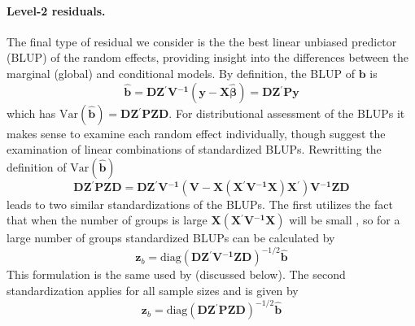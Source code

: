 \documentclass[12pt]{article} %
\newcommand{\inv}{\ensuremath{^{-1}}}
\newcommand{\trans}{\ensuremath{^\prime}}
\newcommand{\var}{\ensuremath{\mathrm{Var}}}
\begin{document}
\paragraph{Level-2 residuals.}
The final type of residual we consider is the the best linear unbiased predictor (BLUP) of the random effects, providing insight into the differences between the marginal (global) and conditional models. By definition, the BLUP of $\bm{b}$ is
%
\begin{equation}\label{eq:lev2resid}
\widehat{\bm{b}} = \bm{D Z\trans V\inv} \left( \bm{y} - \bm{X \widehat{\beta}} \right) = \bm{D Z\trans P y}
\end{equation}
%
which has $\var(\widehat{\bm{b}}) = \bm{DZ\trans P ZD}$. 
For distributional assessment of the BLUPs it makes sense to examine each random effect individually, though \cite{Lange:1989uu} suggest the examination of linear combinations of standardized BLUPs. Rewritting the definition of $\var(\widehat{\bm{b}})$
%
\begin{equation}
\bm{DZ\trans P ZD} = \bm{DZ\trans} \bm{V\inv} \left( \bm{V} - \bm{ X} \left( \bm{X\trans V\inv X} \right) \bm{X \trans} \right) \bm{V\inv} \bm{ZD}
\end{equation}
%
leads to two similar standardizations of the BLUPs. The first utilizes the fact that when the number of groups is large $\bm{ X} \left( \bm{X\trans V\inv X} \right)$ will be small \citep{Goldstein:2003}, so for a large number of groups standardized BLUPs can be calculated by
%
\begin{equation}\label{eq:lev2-std1}
\bm{z}_{b} = \text{diag} \left(\bm{DZ\trans V\inv ZD}\right)^{-1/2} \widehat{\bm{b}}
\end{equation}
%
This formulation is the same used by \cite{Lange:1989uu} (discussed below).
The second standardization applies for all sample sizes and is given by
%
\begin{equation}\label{eq:lev2-std2}
\bm{z}_{b} = \text{diag} \left(\bm{DZ\trans P ZD}\right)^{-1/2} \widehat{\bm{b}}
\end{equation}
%
\end{document}
